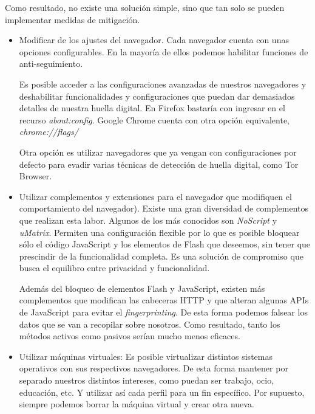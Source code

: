 Como resultado, no existe una solución simple, sino que tan solo se pueden implementar medidas de mitigación\cite{mitigations_w3c}. \par 

\begin{itemize}
	\item Modificar de los ajustes del navegador. Cada navegador cuenta con unas opciones configurables. En la mayoría de ellos podemos habilitar funciones de anti-seguimiento. \par
	
	Es posible acceder a las configuraciones avanzadas de nuestros navegadores y deshabilitar funcionalidades y configuraciones que puedan dar demasiados detalles de nuestra huella digital. En Firefox bastaría con ingresar en el recurso \textit{about:config}. Google Chrome cuenta con otra opción equivalente, \textit{chrome://flags/} \par
	
	Otra opción es utilizar navegadores que ya vengan con configuraciones por defecto para evadir varias técnicas de detección de huella digital, como Tor Browser. \par 
	
	\item Utilizar complementos y extensiones para el navegador que modifiquen el comportamiento del navegador\cite{pixelprivacy}). Existe una gran diversidad de complementos que realizan esta labor. Algunos de los más conocidos son \textit{NoScript} y \textit{uMatrix}.
	Permiten una configuración flexible por lo que es posible bloquear sólo el código JavaScript y los elementos de Flash que deseemos, sin tener que prescindir de la funcionalidad completa. Es una solución de compromiso que busca el equilibro entre privacidad y funcionalidad. \par
	
	Además del bloqueo de elementos Flash y JavaScript, existen más complementos que modifican las cabeceras HTTP y que alteran algunas APIs de JavaScript para evitar el \textit{fingerprinting}. De esta forma podemos falsear los datos que se van a recopilar sobre nosotros. Como resultado, tanto los métodos activos como pasivos serían mucho menos eficaces. \par 
	
	
	\item Utilizar máquinas virtuales: Es posible virtualizar distintos sistemas operativos con sus respectivos navegadores. De esta forma mantener por separado nuestros distintos intereses, como puedan ser trabajo, ocio, educación, etc. Y utilizar así cada perfil para un fin específico. Por supuesto, siempre podemos borrar la máquina virtual y crear otra nueva\cite{restoreprivacy}. \par 
	
\end{itemize}

